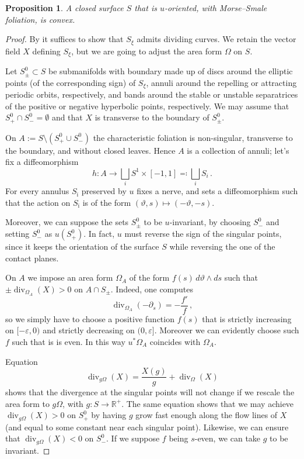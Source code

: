 \documentclass[a4paper, 11pt]{amsart}
\theoremstyle{plain}
\newtheorem{prop}{Proposition}[section]
\theoremstyle{definition}
\newcommand{\R}{\mathbb{R}}
\newcommand{\bimath}{\bar{\imath}}
\renewcommand{\epsilon}{\varepsilon}
\renewcommand{\theta}{\vartheta}
\DeclareMathOperator{\diver}{div}
\begin{document}
\begin{prop}\label{MorseSmaleconvex}
	A closed surface $S$ that is $u$-oriented, with Morse--Smale foliation, is convex.
\end{prop}
\begin{proof}
	By  it suffices to show that $S_\xi$ admits dividing curves. We retain the vector field $X$ defining $S_\xi$, but we are going to adjust the area form $\Omega$ on $S$.
	
	Let $S^0_\pm \subset S$ be submanifolds with boundary made up of discs around the elliptic points (of the corresponding sign) of $S_\xi$, annuli around the repelling or attracting periodic orbits, respectively, and bands around the stable or unstable separatrices of the positive or negative hyperbolic points, respectively. We may assume that $S^0_+ \cap S^0_- = \emptyset$ and that $X$ is transverse to the boundary of $S^0_\pm$.
	
	On $A := S \setminus (S^0_+ \cup S^0_-)$ the characteristic foliation is non-singular, transverse to the boundary, and without closed leaves. Hence $A$ is a collection of annuli; let's fix a diffeomorphism 
	\[
		h \colon A \to \bigsqcup_i S^1 \times [-1,1] \eqqcolon \bigsqcup_i S_i\,.
	\]	
	For every annulus $S_{\bimath}$ preserved by $u$  fixes a nerve, and sets a diffeomorphism such that the action on $S_{\bimath}$ is of the form $(\theta,s) \mapsto (-\theta, -s)$.
	
	Moreover, we can suppose the sets $S_\pm^0$ to be $u$-invariant, by choosing $S^0_-$ and setting $S^0_-$ as $u(S^0_+)$. In fact, $u$ must reverse the sign of the singular points, since it keeps the orientation of the surface $S$ while reversing the one of the contact planes.
	
	On $A$ we impose an area form $\Omega_A$ of the form $f(s)\,d\theta\wedge ds$ such that $\pm\diver_{\Omega_A}(X) > 0$ on $A\cap S_\pm$. Indeed, one computes 
	\[
	\diver_{\Omega_A}(-\partial_s)=-\frac{f'}{f}\,,
	\]
	so we simply have to choose a positive function $f(s)$ that is strictly increasing	on $[-\epsilon,0)$ and strictly decreasing on $(0,\epsilon]$. Moreover we can evidently choose such $f$ such that is is even. In this way $u^*\Omega_A$ coincides with $\Omega_A$.
		
	Equation
	\[
		\diver_{g\Omega}(X)=\frac{X(g)}{g} +\diver_\Omega(X)
	\] 
	shows that the divergence at the singular points will not change if we rescale the area form to $g\Omega$, with $g: S \to \R^+$. The same equation shows that we may achieve $\operatorname{div}_{g\Omega}(X) > 0$ on $S^0_+$ by having $g$ grow fast enough along the flow lines of $X$ (and equal to some constant near each singular point). Likewise, we can ensure that $\operatorname{div}_{g\Omega}(X) < 0$ on $S^0_-$. If we suppose $f$ being $s$-even, we can take $g$ to be invariant.
	


\end{proof}
\end{document}
